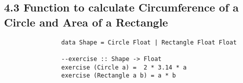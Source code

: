 \documentclass{article}
\begin{document}
	\subsection*{4.3 Function to calculate Circumference of a Circle and Area of a Rectangle}
	\begin{adjustwidth}{2em}{2em}	
		\begin{tcolorbox}
			\begin{verbatim}
				data Shape = Circle Float | Rectangle Float Float
				
				--exercise :: Shape -> Float
				exercise (Circle a) =  2 * 3.14 * a
				exercise (Rectangle a b) = a * b
			\end{verbatim}
		\end{tcolorbox}	
	\end{adjustwidth}
\end{document}
